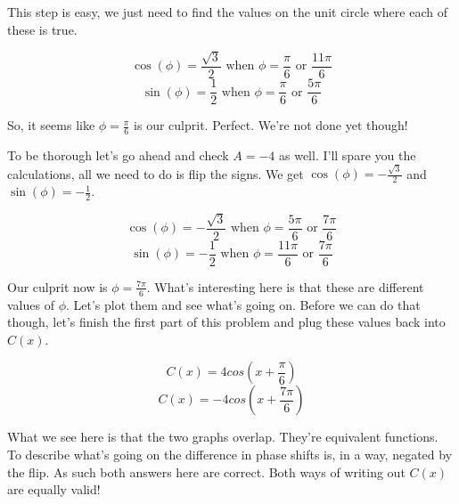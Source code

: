 \documentclass[10pt,letterpaper]{amspset}
\begin{document}
\begin{solution}
    This step is easy, we just need to find the values on the unit circle where each of these is true. 

    \[ \cos(\phi) = \frac{\sqrt{3}}{2} \text{  when  } \phi = \frac{\pi}{6} \text{  or  } \frac{11\pi}{6}\]
    \[ \sin(\phi) = \frac{1}{2} \text{  when  } \phi = \frac{\pi}{6} \text{  or  } \frac{5\pi}{6}\]

    So, it seems like $\phi = \frac{\pi}{6}$ is our culprit. Perfect. We're not done yet though! 

\pagebreak

    To be thorough let's go ahead and check $A = -4$ as well. I'll spare you the calculations, all we need to do is flip the signs. We get $\cos(\phi) = -\frac{\sqrt{3}}{2}$ and $\sin(\phi) = -\frac{1}{2}$. 
    
    \[ \cos(\phi) = -\frac{\sqrt{3}}{2} \text{  when  } \phi = \frac{5\pi}{6} \text{  or  } \frac{7\pi}{6}\]
    \[ \sin(\phi) = -\frac{1}{2} \text{  when  } \phi = \frac{11\pi}{6} \text{  or  } \frac{7\pi}{6}\]
    
    Our culprit now is $\phi = \frac{7\pi}{6}$. What's interesting here is that these are different values of $\phi$. Let's plot them and see what's going on. Before we can do that though, let's finish the first part of this problem and plug these values back into $C(x)$.
    
    \[ C(x) = 4 cos \left( x + \frac{\pi}{6} \right) \]
    \[ C(x) = -4 cos \left( x + \frac{7\pi}{6} \right) \]
    
    
    What we see here is that the two graphs overlap. They're equivalent functions. To describe what's going on the difference in phase shifts is, in a way, negated by the flip. As such both answers here are correct. Both ways of writing out $C(x)$ are equally valid!  
    

\end{solution}
\end{document}
